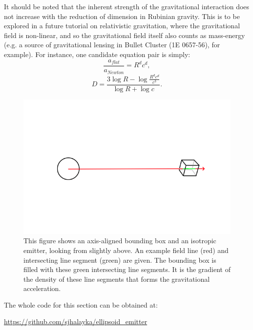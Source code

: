 \documentclass[12pt]{article}
\begin{document}
It should be noted that the inherent strength of the gravitational interaction does not increase with the reduction of dimension in Rubinian gravity.
This is to be explored in a future tutorial on relativistic gravitation, where the gravitational field is non-linear, and so the gravitational field itself also counts as mass-energy (e.g. a source of gravitational lensing in Bullet Cluster (1E 0657-56), for example).
For instance, one candidate equation pair is simply:
\begin{equation}
\frac{a_{\textit{flat}}}{a_{\textit{Newton}}} = R^{d} c^{d},
\end{equation}
\begin{equation}
D = \frac{3 \log R  - \log \frac{R^{d} c^{d}}{c^3}}{ \log R + \log c  }.
\end{equation}




\begin{figure} 
\centering
\label{fig1}
  \includegraphics[width = 7 in]{AABB.png}
  \caption{
This figure shows an axis-aligned bounding box and an isotropic emitter, looking from slightly above.
An example field line (red) and intersecting line segment (green) are given.
The bounding box is filled with these green intersecting line segments.
It is the gradient of the density of these line segments that forms the gravitational acceleration.
}
\end{figure}





The whole code for this section can be obtained at:

\url{https://github.com/sjhalayka/ellipsoid_emitter}
\end{document}
